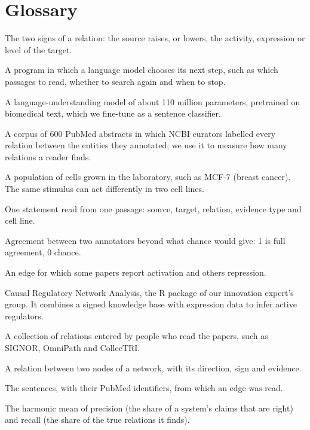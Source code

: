 \documentclass[11pt,a4paper]{article}
\begin{document}
\section{Glossary}

\begin{description}[leftmargin=0.6cm, itemsep=0.2em]
  \item[Activation, repression] The two signs of a relation: the source raises, or lowers, the activity, expression or level of the target.
  \item[Agent] A program in which a language model chooses its next step, such as which passages to read, whether to search again and when to stop.
  \item[BiomedBERT] A language-understanding model of about 110 million parameters, pretrained on biomedical text, which we fine-tune as a sentence classifier.
  \item[BioRED] A corpus of 600 PubMed abstracts in which NCBI curators labelled every relation between the entities they annotated; we use it to measure how many relations a reader finds.
  \item[Cell line] A population of cells grown in the laboratory, such as MCF-7 (breast cancer). The same stimulus can act differently in two cell lines.
  \item[Claim] One statement read from one passage: source, target, relation, evidence type and cell line.
  \item[Cohen's kappa ($\kappa$)] Agreement between two annotators beyond what chance would give: 1 is full agreement, 0 chance.
  \item[Conflict] An edge for which some papers report activation and others repression.
  \item[CRNA] Causal Regulatory Network Analysis, the R package of our innovation expert's group. It combines a signed knowledge base with expression data to infer active regulators.
  \item[Curated database] A collection of relations entered by people who read the papers, such as SIGNOR, OmniPath and CollecTRI.
  \item[Edge] A relation between two nodes of a network, with its direction, sign and evidence.
  \item[Evidence] The sentences, with their PubMed identifiers, from which an edge was read.
  \item[F1 score] The harmonic mean of precision (the share of a system's claims that are right) and recall (the share of the true relations it finds).

\end{description}
\end{document}
